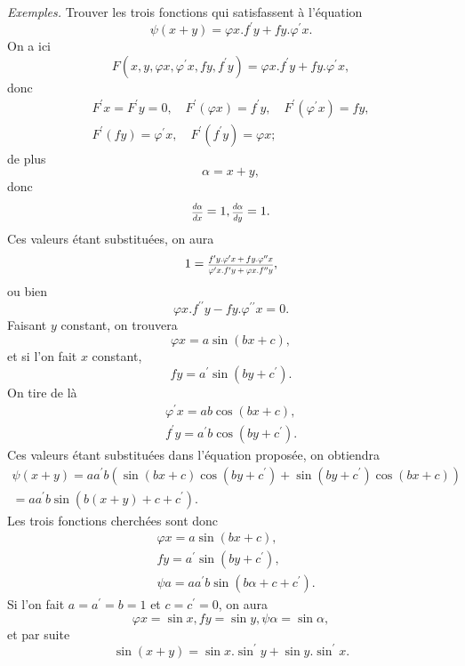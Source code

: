\documentclass[oneside, 12 pt, leqno]{memoir}
\let\oldfrac\frac
\def\frac#1#2{\mathchoice{\text{\scalebox{.83}{${\oldfrac{#1}{#2}}$}}}{\text{\scalebox{.83}{${\displaystyle\oldfrac{#1}{#2}}$}}}{\genfrac{}{}{}{2}{#1}{#2}}{\genfrac{}{}{}{3}{#1}{#2}}}
\begin{document}
\textit{Exemples.} Trouver les trois fonctions qui satisfassent à l'équation
\[\psi(x+y)=\varphi x. f^{\prime} y+f y. \varphi^{\prime} x.\]
On a ici
\[F\left(x, y, \varphi x, \varphi^{\prime} x, f y, f^{\prime} y\right)=\varphi x. f^{\prime} y+f y. \varphi^{\prime} x,\]
donc
\[\begin{gathered}
F^{\prime} x=F^{\prime} y=0, \quad F^{\prime}(\varphi x)=f^{\prime} y, \quad F^{\prime}\left(\varphi^{\prime} x\right)=f y,\\
F^{\prime}(f y)=\varphi^{\prime} x, \quad F^{\prime}\left(f^{\prime} y\right)=\varphi x;
\end{gathered}\]
de plus
\[\alpha=x+y,\]
donc
\[\frac{d \alpha}{d x}=1, \frac{d \alpha}{d y}=1.\]
Ces valeurs étant substituées, on aura
\[1=\frac{f^{\prime} y. \varphi^{\prime} x+f y. \varphi^{\prime \prime} x}{\varphi^{\prime} x. f^{\prime} y+\varphi x. f^{\prime \prime} y},\]
ou bien
\[\varphi x. f^{\prime \prime} y-f y. \varphi^{\prime \prime} x=0.\]
Faisant \(y\) constant, on trouvera
\[\varphi x=a \sin (b x+c),\]
et si l'on fait \(x\) constant,
\[f y=a^{\prime} \sin \left(b y+c^{\prime}\right).\]
On tire de là
\[\begin{gathered}
\varphi^{\prime} x=a b \cos (b x+c), \\
f^{\prime} y=a^{\prime} b \cos \left(b y+c^{\prime}\right).
\end{gathered}\]
Ces valeurs étant substituées dans l'équation proposée, on obtiendra
\[\begin{gathered}
\psi(x+y)=a a^{\prime} b\left(\sin (b x+c) \cos \left(b y+c^{\prime}\right)+\sin \left(b y+c^{\prime}\right) \cos (b x+c)\right) \\
=a a^{\prime} b \sin \left(b(x+y)+c+c^{\prime}\right).
\end{gathered}
\] \clearpage\noindent%
Les trois fonctions cherchées sont donc
\[\begin{aligned}
& \varphi x=a \sin (b x+c),\\
& f y=a^{\prime} \sin \left(b y+c^{\prime}\right),\\
& \psi a=a a^{\prime} b \sin \left(b \alpha+c+c^{\prime}\right).
\end{aligned}\]
Si l'on fait \(a=a^{\prime}=b=1\) et \(c=c^{\prime}=0\), on aura
\[\varphi x=\sin x, f y=\sin y, \psi \alpha=\sin \alpha,\]
et par suite
\[ \sin (x+y)=\sin x. \sin ^{\prime} y+\sin y. \sin ^{\prime} x.\]
\end{document}
